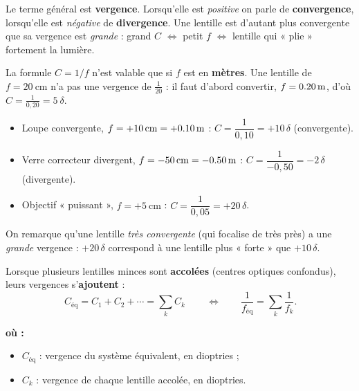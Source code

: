 \documentclass[11pt,a4paper]{article}
\newenvironment{ou}{%
  \par\smallskip\noindent\textbf{où :}\nopagebreak
  \begin{itemize}[leftmargin=1.8em,topsep=2pt,itemsep=1.5pt,parsep=0pt]}%
  {\end{itemize}}
\begin{document}
\begin{remarque}
Le terme général est \textbf{vergence}. Lorsqu'elle est \emph{positive} on parle de \textbf{convergence},
lorsqu'elle est \emph{négative} de \textbf{divergence}. Une lentille est d'autant plus convergente que
sa vergence est \emph{grande} : grand $C$ $\Leftrightarrow$ petit $f$ $\Leftrightarrow$ lentille qui
« plie » fortement la lumière.
\end{remarque}

\begin{attention}
La formule $C=1/f$ n'est valable que si $f$ est en \textbf{mètres}. Une lentille de
$f=\SI{20}{\centi\metre}$ n'a pas une vergence de $\tfrac{1}{20}$ : il faut d'abord convertir,
$f=\SI{0{,}20}{\metre}$, d'où $C=\tfrac{1}{0{,}20}=\SI{5}{\delta}$.
\end{attention}

\begin{exemple}
\begin{itemize}[leftmargin=1.7em,topsep=2pt,itemsep=1pt]
  \item Loupe convergente, $f=+\SI{10}{\centi\metre}=+\SI{0{,}10}{\metre}$ :
        $C=\dfrac{1}{0{,}10}=+10\,\delta$ (convergente).
  \item Verre correcteur divergent, $f=-\SI{50}{\centi\metre}=-\SI{0{,}50}{\metre}$ :
        $C=\dfrac{1}{-0{,}50}=-2\,\delta$ (divergente).
  \item Objectif « puissant », $f=+\SI{5}{\centi\metre}$ : $C=\dfrac{1}{0{,}05}=+20\,\delta$.
\end{itemize}
On remarque qu'une lentille \emph{très convergente} (qui focalise de très près) a une \emph{grande}
vergence : $+20\,\delta$ correspond à une lentille plus « forte » que $+10\,\delta$.
\end{exemple}

\begin{theoreme}
Lorsque plusieurs lentilles minces sont \textbf{accolées} (centres optiques confondus), leurs vergences
s'\textbf{ajoutent} :
\[ \boxed{\,C_{\text{éq}}=C_1+C_2+\cdots=\sum_k C_k\,}
   \qquad\Longleftrightarrow\qquad \frac{1}{f_{\text{éq}}}=\sum_k\frac{1}{f_k}. \]
\begin{ou}
  \item $C_{\text{éq}}$ : vergence du système équivalent, en dioptries ;
  \item $C_k$ : vergence de chaque lentille accolée, en dioptries.
\end{ou}
\end{theoreme}
\end{document}
